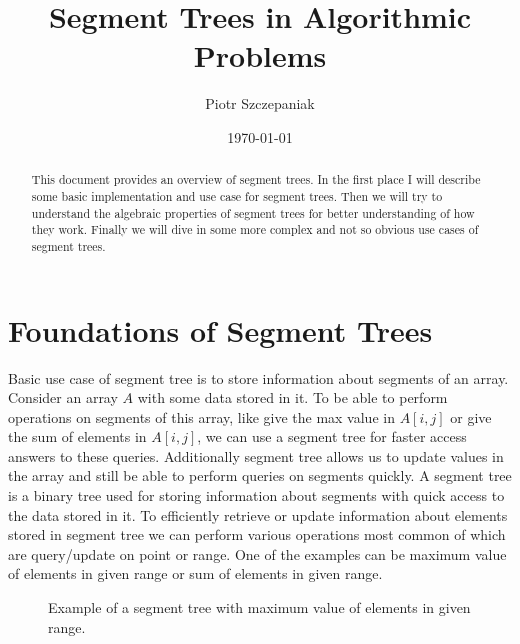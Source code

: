\documentclass{article}
\title{Segment Trees in Algorithmic Problems}
\author{Piotr Szczepaniak}
\date{\today}
\begin{document}
\maketitle

\tableofcontents

\begin{abstract}
This document provides an overview of segment trees. In the first place
I will describe some basic implementation and use case for segment trees.
Then we will try to understand the algebraic properties of segment trees for
better understanding of how they work. Finally we will dive in some more complex and not so obvious
use cases of segment trees.
\end{abstract}

\section{Foundations of Segment Trees}
Basic use case of segment tree is to store information about segments of an array.
Consider an array \(A\) with some data stored in it. To be able to perform operations on segments of this array, like
give the max value in \(A[i, j]\) or give the sum of elements in \(A[i, j]\), we can use a segment tree for faster
access answers to these queries. Additionally segment tree allows us to update values in the array and still be able to perform queries on segments quickly.
A segment tree is a binary tree used for storing information about segments with quick access to the data stored in it. 
To efficiently retrieve or update information about elements stored 
in segment tree we can perform various operations most common of which are
query/update on point or range.
One of the examples can be maximum value of 
elements in given range or sum of elements in given range.

\begin{figure}[H]
    \centering
    
    \caption{Example of a segment tree with maximum value of elements in given range.}
    \label{fig:segment_tree_1}
\end{figure}
\end{document}
